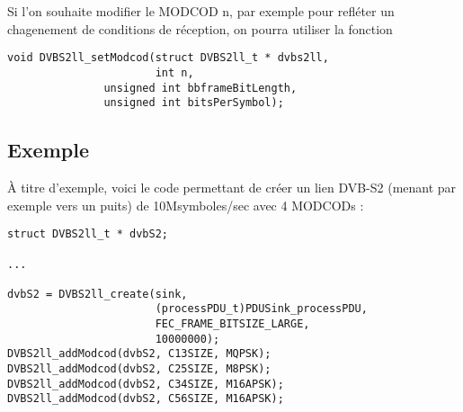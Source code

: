    Si l'on souhaite modifier le MODCOD n, par exemple pour refléter un
chagenement de conditions de réception, on pourra utiliser la fonction

\begin{verbatim}
void DVBS2ll_setModcod(struct DVBS2ll_t * dvbs2ll,
                       int n,
		       unsigned int bbframeBitLength,
		       unsigned int bitsPerSymbol);
\end{verbatim}

\subsection{Exemple}

   À titre d'exemple, voici le code permettant de créer un lien DVB-S2
(menant par exemple vers un puits) de 10Msymboles/sec avec 4 MODCODs :

\begin{verbatim}
struct DVBS2ll_t * dvbS2;

...

dvbS2 = DVBS2ll_create(sink,
                       (processPDU_t)PDUSink_processPDU,
                       FEC_FRAME_BITSIZE_LARGE,
                       10000000);
DVBS2ll_addModcod(dvbS2, C13SIZE, MQPSK);
DVBS2ll_addModcod(dvbS2, C25SIZE, M8PSK);
DVBS2ll_addModcod(dvbS2, C34SIZE, M16APSK);
DVBS2ll_addModcod(dvbS2, C56SIZE, M16APSK);
\end{verbatim}

